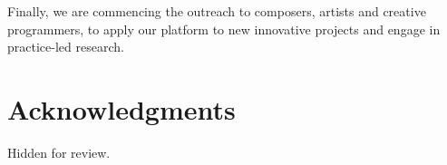 \documentclass{nime-alternate}
\begin{document}


Finally, we are commencing the outreach to composers, artists and creative programmers, to apply our platform to new innovative projects and engage in practice-led research.


\section{Acknowledgments}
Hidden for review.

%



\end{document}

